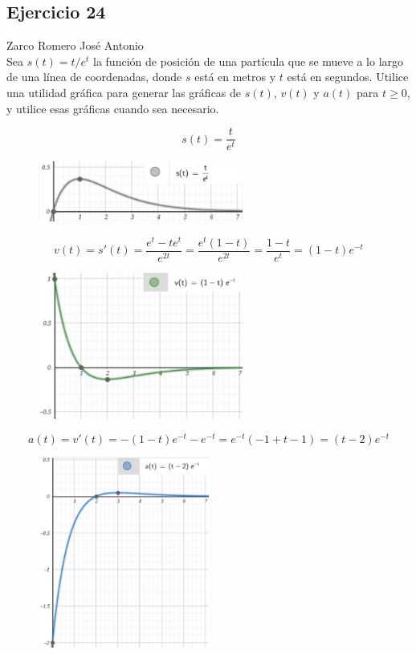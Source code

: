 \documentclass[12pt]{article}
\begin{document}
\subsection{Ejercicio 24} Zarco Romero José Antonio \\

Sea $s(t) = t /e^t$ la función de posición de una partícula que se mueve a lo largo de una línea de coordenadas, donde $s$ está en metros y $t$ está en segundos. Utilice una utilidad gráfica para generar las gráficas de $s(t)$, $v(t)$ y $a(t)$ para $t \geq 0$, y utilice esas gráficas cuando sea necesario.

\[s(t) = \frac{t}{e^t}\]
\begin{figure}[H]
\centering
\includegraphics[width=0.6\textwidth]{../img/img_Lista3/3_s.png}
\end{figure}
\[v(t)=s'(t)= \frac{e^t-te^t}{e^{2t}}=\frac{e^t(1-t)}{e^{2t}}=\frac{1-t}{e^t}=(1-t)e^{-t}\]
\begin{figure}[H]
\centering
\includegraphics[width=0.6\textwidth]{../img/img_Lista3/3_v.png}
\end{figure}
\[a(t)=v'(t)= -(1-t)e^{-t}-e^{-t}=e^{-t}(-1+t-1)=(t-2)e^{-t}\]
\begin{figure}[H]
\centering
\includegraphics[width=0.5\textwidth]{../img/img_Lista3/3_a.png}
\end{figure}
\end{document}

